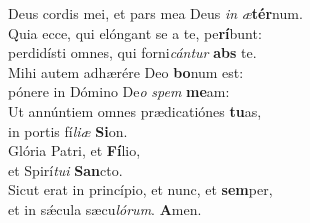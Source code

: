 \oddverse Deus cordis mei, et pars mea Deus \textit{in} \textit{æ}\textbf{tér}num.\\
\evenverse Quia ecce, qui elóngant se a te, pe\textbf{rí}bunt:~\*\\
\evenverse perdidísti omnes, qui forni\textit{cán}\textit{tur} \textbf{abs} te.\\
\oddverse Mihi autem adhærére Deo \textbf{bo}num est:~\*\\
\oddverse pónere in Dómino De\textit{o} \textit{spem} \textbf{me}am:\\
\evenverse Ut annúntiem omnes prædicatiónes \textbf{tu}as,~\*\\
\evenverse in portis fí\textit{li}\textit{æ} \textbf{Si}on.\\
\oddverse Glória Patri, et \textbf{Fí}lio,~\*\\
\oddverse et Spirí\textit{tu}\textit{i} \textbf{San}cto.\\
\evenverse Sicut erat in princípio, et nunc, et \textbf{sem}per,~\*\\
\evenverse et in sǽcula sæcu\textit{ló}\textit{rum}. \textbf{A}men.\\
